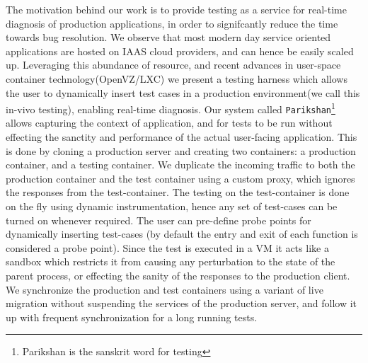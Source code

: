 The motivation behind our work is to provide testing as a service for real-time diagnosis of production applications, in order to signifcantly reduce the time towards bug resolution.
We observe that most modern day service oriented applications are hosted on IAAS cloud providers, and can hence be easily scaled  up. 
Leveraging this abundance of resource, and recent advances in user-space container technology(OpenVZ/LXC\cite{openvz,linux}) we present a testing harness which allows the user to dynamically insert test cases in a production environment(we call this in-vivo testing), enabling real-time diagnosis.
Our system called \texttt{Parikshan}\footnote{Parikshan is the sanskrit word for testing} allows capturing the context of application, and for tests to be run without effecting the sanctity and performance of the actual user-facing application. 
This is done by cloning a production server and creating two containers: a production container, and a testing container. 
We duplicate the incoming traffic to both the production container and the test container using a custom proxy, which ignores the responses from the test-container. 
The testing on the test-container is done on the fly using dynamic instrumentation, hence any set of test-cases can be turned on whenever required. 
The user can pre-define probe points for dynamically inserting test-cases (by default the entry and exit of each function is considered a probe point).
Since the test is executed in a VM it acts like a sandbox which restricts it from causing any perturbation to the state of the parent process, or effecting the sanity of the responses to the production client. 
We synchronize the production and test containers using a variant of live migration without suspending the services of the production server, and follow it up with frequent synchronization for a long running tests. 

